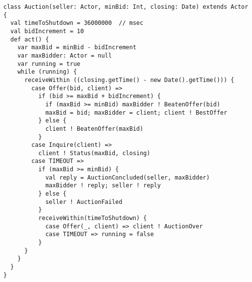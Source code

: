 
\begin{lstlisting}[style=floating,label=fig:simple-auction,caption=Implementation of an Auction Service]
class Auction(seller: Actor, minBid: Int, closing: Date) extends Actor {
  val timeToShutdown = 36000000  // msec
  val bidIncrement = 10
  def act() {
    var maxBid = minBid - bidIncrement
    var maxBidder: Actor = null
    var running = true
    while (running) {
      receiveWithin ((closing.getTime() - new Date().getTime())) {
        case Offer(bid, client) =>
          if (bid >= maxBid + bidIncrement) { 
            if (maxBid >= minBid) maxBidder ! BeatenOffer(bid)
            maxBid = bid; maxBidder = client; client ! BestOffer
          } else {
            client ! BeatenOffer(maxBid)
          }
        case Inquire(client) =>
          client ! Status(maxBid, closing)
        case TIMEOUT =>
          if (maxBid >= minBid) {
            val reply = AuctionConcluded(seller, maxBidder)
            maxBidder ! reply; seller ! reply
          } else {
            seller ! AuctionFailed
          }
          receiveWithin(timeToShutdown) {
            case Offer(_, client) => client ! AuctionOver
            case TIMEOUT => running = false
          }
      }
    }
  } 
}
\end{lstlisting}



